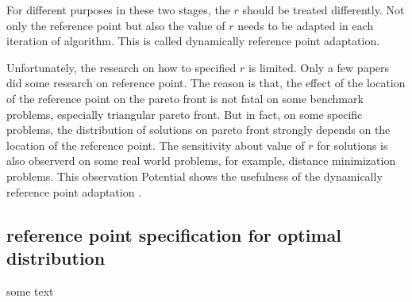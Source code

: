 \documentclass[conference]{IEEEtran}
\begin{document}
For different purposes in these two stages, the $r$ should be treated differently\cite{ut}. 
Not only the reference point but also the value of $r$ 
needs to be adapted in each iteration of algorithm. 
This is called dynamically reference point adaptation. 

Unfortunately, the research on how to specified $r$ is limited.
Only a few papers\cite{hisao1, hisao2, hisao3, zhangqingfuHypE} did some research on reference point. 
The reason is that, the effect of the location of the reference point on the pareto front 
is not fatal on some benchmark problems, especially triangular pareto front. 
But in fact, on some specific problems, the distribution of solutions on pareto front
strongly depends on the location of the reference point. 
The sensitivity about value of $r$ for solutions is also observerd on some real world problems,
for example, distance minimization problems.
This observation Potential shows the usefulness of the dynamically reference point adaptation
\cite{hisao}.

%
\subsection{reference point specification for optimal distribution}
some text

%
% 
\end{document}
